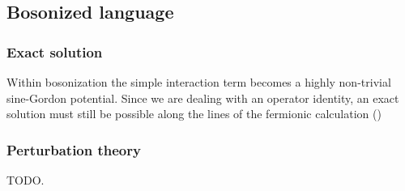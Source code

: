 \documentclass[english, parskip=full]{scrartcl}
\begin{document}
\subsection{Bosonized language}
\subsubsection{Exact solution}
Within bosonization the simple interaction term becomes a highly non-trivial sine-Gordon potential.
Since we are dealing with an operator identity, an exact solution must still be possible along the lines of the fermionic calculation ()
\subsubsection{Perturbation theory}
TODO.






\end{document}
